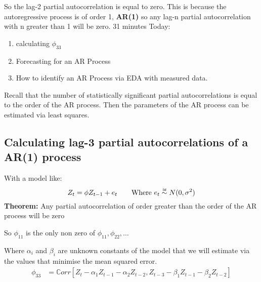 So the lag-2 partial autocorrelation is equal to zero. This is because the
autoregressive process is of order 1, \textbf{AR(1)} so any lag-n partial
autocorrelation with n greater than 1 will be zero.
31 minutes
Today:
\begin{enumerate}
    \item calculating $\phi_{33}$
    \item Forecasting for an AR Process
    \item How to identify an AR Process via EDA with measured data.
\end{enumerate}
Recall that the number of statistically significant partial autocorrelations is
equal to the order of the AR process. Then the parameters of the AR process can
be estimated via least squares.

\subsection{Calculating lag-3 partial autocorrelations of a AR(1) process}

With a model like:
\begin{equation*}
    Z_{t} = \phi Z_{t-1} + e_{t} \qquad \text{Where $e_t \iid N(0, \sigma^2)$}
\end{equation*}
\textbf{Theorem:} Any partial autocorrelation of order greater than the order
of the AR process will be zero

So $\phi_{11}$ is the only non zero of $\phi_{11}, \phi_{22}, \dots $

Where $\alpha_{i}$ and $\beta_{i}$ are unknown constants of the model that we
will estimate via the values that minimise the mean squared error.
\begin{equation*}
    \begin{aligned}
        \phi_{33} &= \mathbb{C}orr\left[Z_{t} - \alpha_{1}Z_{t-1} -
        \alpha_{2}Z_{t-2}, Z_{t-3} - \beta_{1}Z_{t-1} - \beta_{2}Z_{t-2}\right] \\
    \end{aligned}
\end{equation*}


